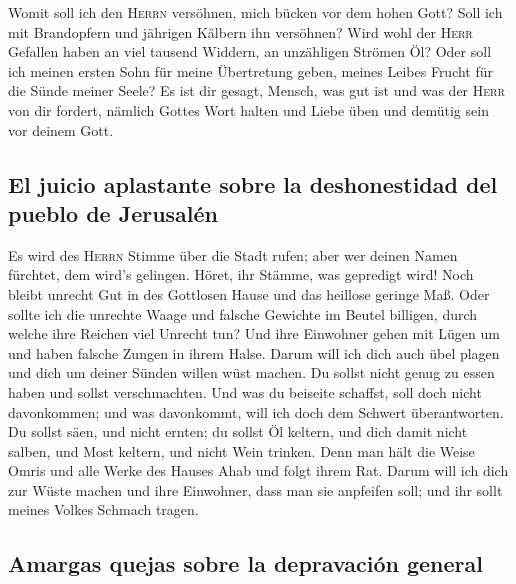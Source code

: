  Womit soll ich den \textsc{Herrn} versöhnen, mich bücken
vor dem hohen Gott? Soll ich mit Brandopfern und jährigen Kälbern ihn
versöhnen?  Wird wohl der \textsc{Herr} Gefallen haben an
viel tausend Widdern, an unzähligen Strömen Öl? Oder soll ich meinen
ersten Sohn für meine Übertretung geben, meines Leibes Frucht für die
Sünde meiner Seele?  Es ist dir gesagt, Mensch, was gut
ist und was der \textsc{Herr} von dir fordert, nämlich Gottes Wort
halten und Liebe üben und demütig sein vor deinem Gott.

\hypertarget{el-juicio-aplastante-sobre-la-deshonestidad-del-pueblo-de-jerusaluxe9n}{%
\subsection{El juicio aplastante sobre la deshonestidad del pueblo de
Jerusalén}\label{el-juicio-aplastante-sobre-la-deshonestidad-del-pueblo-de-jerusaluxe9n}}

 Es wird des \textsc{Herrn} Stimme über die Stadt rufen;
aber wer deinen Namen fürchtet, dem wird's gelingen. Höret, ihr Stämme,
was gepredigt wird!  Noch bleibt unrecht Gut in des
Gottlosen Hause und das heillose geringe Maß.  Oder
sollte ich die unrechte Waage und falsche Gewichte im Beutel billigen,
 durch welche ihre Reichen viel Unrecht tun? Und ihre
Einwohner gehen mit Lügen um und haben falsche Zungen in ihrem Halse.
 Darum will ich dich auch übel plagen und dich um deiner
Sünden willen wüst machen.  Du sollst nicht genug zu
essen haben und sollst verschmachten. Und was du beiseite schaffst, soll
doch nicht davonkommen; und was davonkommt, will ich doch dem Schwert
überantworten.  Du sollst säen, und nicht ernten; du
sollst Öl keltern, und dich damit nicht salben, und Most keltern, und
nicht Wein trinken.  Denn man hält die Weise Omris und
alle Werke des Hauses Ahab und folgt ihrem Rat. Darum will ich dich zur
Wüste machen und ihre Einwohner, dass man sie anpfeifen soll; und ihr
sollt meines Volkes Schmach tragen.

\hypertarget{amargas-quejas-sobre-la-depravaciuxf3n-general}{%
\subsection{Amargas quejas sobre la depravación
general}\label{amargas-quejas-sobre-la-depravaciuxf3n-general}}

